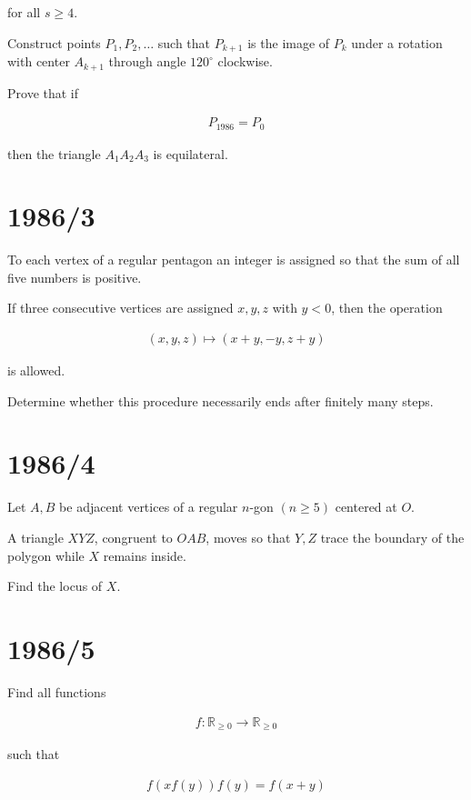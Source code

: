\documentclass[12pt]{article}
\begin{document}
for all $s \geq 4$.

Construct points $P_1,P_2,\dots$ such that $P_{k+1}$ is the image of $P_k$ under a rotation with center $A_{k+1}$ through angle $120^\circ$ clockwise.

Prove that if

\begin{align*}
P_{1986}=P_0
\end{align*}

then the triangle $A_1A_2A_3$ is equilateral.

\section*{1986/3}

To each vertex of a regular pentagon an integer is assigned so that the sum of all five numbers is positive.

If three consecutive vertices are assigned $x,y,z$ with $y<0$, then the operation

\begin{align*}
(x,y,z)\mapsto(x+y,-y,z+y)
\end{align*}

is allowed.

Determine whether this procedure necessarily ends after finitely many steps.

\section*{1986/4}

Let $A,B$ be adjacent vertices of a regular $n$-gon $(n \geq 5)$ centered at $O$.

A triangle $XYZ$, congruent to $OAB$, moves so that $Y,Z$ trace the boundary of the polygon while $X$ remains inside.

Find the locus of $X$.

\section*{1986/5}

Find all functions

\begin{align*}
f:\mathbb{R}_{\geq0}\to\mathbb{R}_{\geq0}
\end{align*}

such that

\begin{align*}
f(xf(y))f(y)=f(x+y)
\end{align*}
\end{document}
